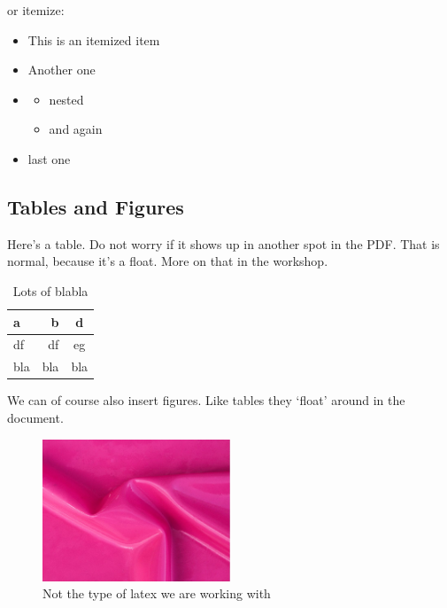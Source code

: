 \documentclass[12pt]{article}
\begin{document}
or itemize:

\begin{itemize}
	\item This is an itemized item
	\item Another one
	\item \begin{itemize}
		\item nested
		\item and again
		\end{itemize}
	\item last one
\end{itemize}


\subsection{Tables and Figures}

Here's a table. Do not worry if it shows up in another spot in the PDF. That is normal, because it's a float. More on that in the workshop.

\begin{table}
	\centering
	\begin{tabular}{|l|r|c|} \hline
		a   & b   & d   \\ \hline
		df  & df  & eg  \\ \hline
		bla & bla & bla \\ \hline
	\end{tabular}
	\caption{Lots of blabla}
	\label{tab:firsttable}
\end{table}



We can of course also insert figures. Like tables they `float' around in the document. 

\begin{figure}
	\centering
	\includegraphics[width=0.5\textwidth]{testpic.jpg}
	\caption{Not the type of latex we are working with}
	\label{fig:testpic}
\end{figure}
\end{document}
